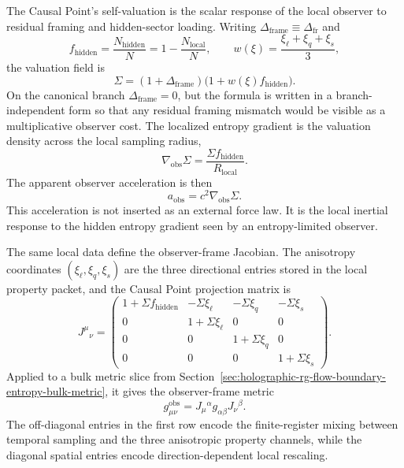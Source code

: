 \documentclass[11pt,letterpaper]{article}
\theoremstyle{plain}
\newcommand{\Deltafr}{\Delta_{\text{fr}}}
\newcommand{\Nbits}{N}
\begin{document}
The Causal Point's self-valuation is the scalar response of the local observer
to residual framing and hidden-sector loading.  Writing
$\Delta_{\text{frame}}\equiv\Deltafr$ and
\begin{equation}
\label{eq:section-seven-hidden-fraction}
 f_{\text{hidden}}
 =
 \frac{N_{\text{hidden}}}{\Nbits}
 =
 1-\frac{N_{\text{local}}}{\Nbits},
 \qquad
 w(\xi)=\frac{\xi_{\ell}+\xi_q+\xi_s}{3},
\end{equation}
the valuation field is
\begin{equation}
\label{eq:section-seven-self-valuation}
 \boxed{
 \Sigma
 =
 (1+\Delta_{\text{frame}})
 \bigl(1+w(\xi)f_{\text{hidden}}\bigr).
 }
\end{equation}
On the canonical branch $\Delta_{\text{frame}}=0$, but the formula is written in a
branch-independent form so that any residual framing mismatch would be visible
as a multiplicative observer cost.  The localized entropy gradient is the
valuation density across the local sampling radius,
\begin{equation}
\label{eq:section-seven-localized-entropy-gradient}
 \boxed{
 \nabla_{\text{obs}}\Sigma
 =
 \frac{\Sigma f_{\text{hidden}}}{R_{\text{local}}}.
 }
\end{equation}
The apparent observer acceleration is then
\begin{equation}
\label{eq:section-seven-apparent-acceleration}
 \boxed{
 a_{\text{obs}}
 =
 c^2\nabla_{\text{obs}}\Sigma.
 }
\end{equation}
This acceleration is not inserted as an external force law.  It is the local
inertial response to the hidden entropy gradient seen by an entropy-limited
observer.

The same local data define the observer-frame Jacobian.  The anisotropy
coordinates $(\xi_{\ell},\xi_q,\xi_s)$ are the three directional entries stored
in the local property packet, and the Causal Point projection matrix is
\begin{equation}
\label{eq:section-seven-observer-jacobian}
 \boxed{
 J^{\mu}{}_{\nu}
 =
 \begin{pmatrix}
 1 + \Sigma f_{\text{hidden}} & -\Sigma\xi_{\ell} & -\Sigma\xi_q & -\Sigma\xi_s\\
 0 & 1+\Sigma\xi_{\ell} & 0 & 0\\
 0 & 0 & 1+\Sigma\xi_q & 0\\
 0 & 0 & 0 & 1+\Sigma\xi_s
 \end{pmatrix}.
 }
\end{equation}
Applied to a bulk metric slice from Section~\ref{sec:holographic-rg-flow-boundary-entropy-bulk-metric},
it gives the observer-frame metric
\begin{equation}
\label{eq:section-seven-observer-metric-pullback}
 g^{\text{obs}}_{\mu\nu}
 =
 J_{\mu}{}^{\alpha}g_{\alpha\beta}J_{\nu}{}^{\beta}.
\end{equation}
The off-diagonal entries in the first row encode the finite-register mixing
between temporal sampling and the three anisotropic property channels, while
the diagonal spatial entries encode direction-dependent local rescaling.
\end{document}
